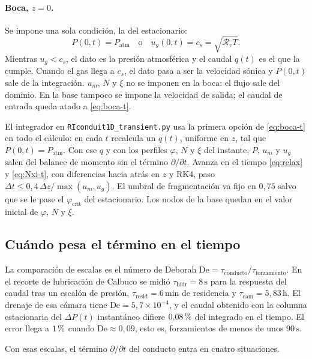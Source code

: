 \documentclass[11pt,a4paper]{article}
\newcommand{\p}{\partial}
\newcommand{\Rv}{\mathcal{R}_v}
\newcommand{\pc}{\ifmmode\text{\,\%}\else\,\%\fi}
\begin{document}
\paragraph{Boca, $z=0$.}
Se impone una sola condición, la del estacionario:
\begin{equation}
\label{eq:boca-t}
P(0,t)=P_{\mathrm{atm}}
\quad\text{o}\quad
u_g(0,t)=c_s=\sqrt{\Rv T}.
\end{equation}
Mientras $u_g<c_s$, el dato es la presión atmosférica y el caudal
$q(t)$ es el que la cumple. Cuando el gas llega a $c_s$, el dato
pasa a ser la velocidad sónica y $P(0,t)$ sale de la integración.
$u_m$, $N$ y $\xi$ no se imponen en la boca: el flujo sale del
dominio. En la base tampoco se impone la velocidad de salida; el
caudal de entrada queda atado a \eqref{eq:boca-t}.

El integrador en \texttt{RIconduit1D\_transient.py} usa la primera
opción de \eqref{eq:boca-t} en todo el cálculo: en cada $t$ recalcula
un $q(t)$, uniforme en $z$, tal que $P(0,t)=P_{\mathrm{atm}}$. Con
ese $q$ y con los perfiles $\varphi$, $N$ y $\xi$ del instante,
$P$, $u_m$ y $u_g$ salen del balance de momento sin el término
$\p/\p t$. Avanza en el tiempo \eqref{eq:relax} y \eqref{eq:Nxi-t},
con diferencias hacia atrás en $z$ y RK4, paso
$\Delta t\le 0{,}4\,\Delta z/\max(u_m,u_g)$. El umbral de
fragmentación va fijo en $0{,}75$ salvo que se le pase el
$\varphi_{\mathrm{crit}}$ del estacionario. Los nodos de la base
quedan en el valor inicial de $\varphi$, $N$ y $\xi$.

\subsection{Cuándo pesa el término en el tiempo}

La comparación de escalas es el número de Deborah
$\mathrm{De}=\tau_{\mathrm{conducto}}/\tau_{\mathrm{forzamiento}}$.
En el recorte de lubricación de Calbuco se midió
$\tau_{\mathrm{hidr}}=8\,\mathrm{s}$ para la respuesta del caudal
tras un escalón de presión, $\tau_{\mathrm{resid}}=6\,\mathrm{min}$
de residencia y $\tau_{\mathrm{cam}}=5{,}83\,\mathrm{h}$. El drenaje
de esa cámara tiene $\mathrm{De}=5{,}7\times 10^{-4}$, y el caudal
obtenido con la columna estacionaria del $\Delta P(t)$ instantáneo
difiere $0{,}08\pc$ del integrado en el tiempo. El error llega a
$1\pc$ cuando $\mathrm{De}\approx 0{,}09$, esto es, forzamientos de
menos de unos $90\,\mathrm{s}$.

Con esas escalas, el término $\p/\p t$ del conducto entra en cuatro
situaciones.
\end{document}
